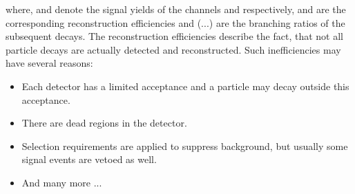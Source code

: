 where, \NDp and \NLc denote the signal yields of the channels \LbToDpmunuX and \LbToLcmunu respectively, \effDp and \effLc are the corresponding reconstruction efficiencies and \BR(...) are the branching ratios of the subsequent decays.
The reconstruction efficiencies describe the fact, that not all particle decays are actually detected and reconstructed.
Such inefficiencies may have several reasons:
\begin{itemize}
    \item Each detector has a limited acceptance and a particle may decay outside this acceptance.
    \item There are dead regions in the detector.
    \item Selection requirements are applied to suppress background, but usually some signal events are vetoed as well.
    \item And many more ...
\end{itemize}

